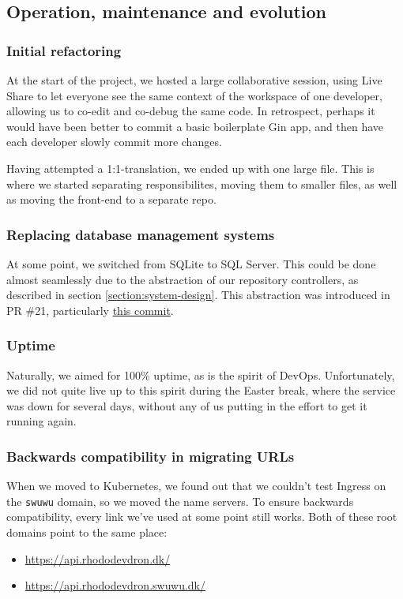 \subsection{Operation, maintenance and evolution}

\subsubsection{Initial refactoring}

At the start of the project, we hosted a large collaborative session, using Live Share \cite{tool:live-share} to let everyone see the same context of the workspace of one developer, allowing us to co-edit and co-debug the same code.
In retrospect, perhaps it would have been better to commit a basic boilerplate Gin app, and then have each developer slowly commit more changes.

Having attempted a 1:1-translation, we ended up with one large file. This is where we started separating responsibilites, moving them to smaller files, as well as moving the front-end to a separate repo.


\subsubsection{Replacing database management systems}

At some point, we switched from SQLite to SQL Server. This could be done almost seamlessly due to the abstraction of our repository controllers, as described in section \ref{section:system-design}.
This abstraction was introduced in PR \#21, particularly \href{https://github.com/Devops-2022-Group-R/itu-minitwit/pull/21/commits/96d0ea601453ff9d3efe52c30b2435c6308f120b}{\color{blue}this commit}.


\subsubsection{Uptime}

Naturally, we aimed for 100\% uptime, as is the spirit of DevOps. Unfortunately, we did not quite live up to this spirit during the Easter break, where the service was down for several days, without any of us putting in the effort to get it running again.


\subsubsection{Backwards compatibility in migrating URLs}

When we moved to Kubernetes, we found out that we couldn't test Ingress on the \texttt{swuwu} domain, so we moved the name servers. To ensure backwards compatibility, every link we've used at some point still works.
Both of these root domains point to the same place:
\begin{itemize}
    \item \url{https://api.rhododevdron.dk/}
    \item \url{https://api.rhododevdron.swuwu.dk/}
\end{itemize}

